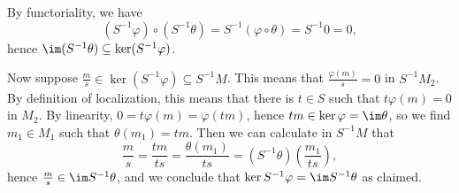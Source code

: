 By functoriality, we have
\[ (S^{-1}\varphi) \circ (S^{-1}\theta) = S^{-1}(\varphi \circ\theta) = S^{-1}0 = 0, \]
hence $\im (S^{-1}\theta) \subseteq\ker (S^{-1}\varphi)$.

Now suppose $\frac{m}{s} \in \ker(S^{-1}\varphi) \subseteq S^{-1}M$. This
means that $\frac{\varphi(m)}{s}= 0$ in $S^{-1}M_2$. By definition of
localization, this means that there is $t \in S$ such that $t\varphi(m) = 0$ in
$M_2$. By linearity, $0 = t\varphi(m) = \varphi(tm)$, hence
$tm \in \ker\varphi = \im\theta$, so we find $m_1 \in M_1$ such that
$\theta(m_1) = tm$. Then we can calculate in $S^{-1}M$ that
\[ \frac{m}{s} = \frac{tm}{ts} = \frac{\theta(m_1)}{ts} = (S^{-1}\theta)(\frac{m_1}{ts}), \]
hence $\frac{m}{s} \in \im S^{-1}\theta$, and we conclude that $\ker S^{-1}\varphi = \im S^{-1}\theta$ as
claimed.
